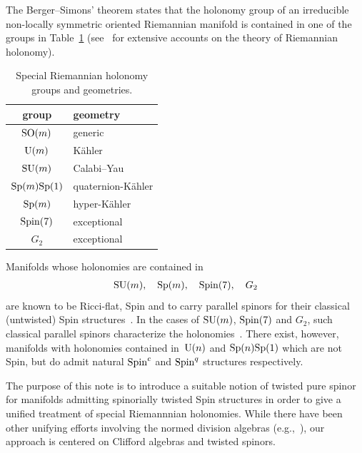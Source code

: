 \documentclass[pdftex]{sigma}
\numberwithin{equation}{section}
\begin{document}
The Berger--Simons' theorem \cite{Berger, Simons} states that the holonomy group of an irreducible non-locally symmetric oriented Riemannian manifold is contained in one of the groups in Table~\ref{table: Berger list} (see~\cite{Joyce, Salamon} for extensive accounts on the theory of Riemannian holonomy).
\begin{table}[h!]\centering
\begin{tabular}{|c|l|}\hline
group & geometry\\\hline
${\rm SO}(m)$ & generic\\
${\rm U}(m)$ & K\"ahler\\
${\rm SU}(m)$ & Calabi--Yau\\
${\rm Sp}(m){\rm Sp}(1)$ & quaternion-K\"ahler\\
${\rm Sp}(m)$ & hyper-K\"ahler\\
${\rm Spin}(7)$ & exceptional\\
$G_2$ & exceptional\\\hline
\end{tabular}
\caption{Special Riemannian holonomy groups and geometries.}\label{table: Berger list}
\end{table}

Manifolds whose holonomies are contained in
\begin{gather*} {\rm SU}(m), \quad {\rm Sp}(m), \quad {\rm Spin}(7),\quad G_2
\end{gather*}
are known to be Ricci-flat, Spin and to carry parallel spinors for their
classical (untwisted) Spin structures~\cite{Hitchin,Wang}. In the cases of ${\rm SU}(m)$, ${\rm Spin}(7)$ and $G_2$, such classical parallel
spinors characterize the holonomies~\cite{Lawson}.
There exist, however, manifolds with holonomies contained in~${\rm U}(n)$ and ${\rm Sp}(n){\rm Sp}(1)$ which are not Spin, but do admit
natural ${\rm Spin}^c$ and ${\rm Spin}^q$ structures respectively.

The purpose of this note is to introduce a suitable notion of twisted pure spinor for manifolds admitting
spinorially twisted Spin structures \cite{Espinosa-Herrera} in order to give a unified
treatment of special Riemannnian holonomies.
While there have been other unifying efforts involving the normed division algebras
(e.g.,~\cite{Leung}),
our approach is centered on Clifford algebras and twisted spinors.
\end{document}
